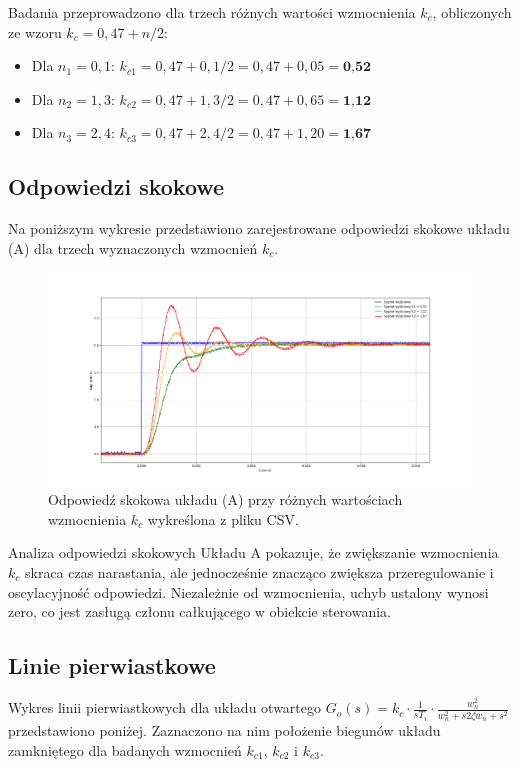 \documentclass[12pt,a4paper]{article}
\begin{document}
	Badania przeprowadzono dla trzech różnych wartości wzmocnienia \(k_c\), obliczonych ze wzoru \(k_c = 0,47 + n/2\):
	\begin{itemize}
		\item Dla \(n_1 = 0,1\): $k_{c1} = 0,47 + 0,1 / 2 = 0,47 + 0,05 = \textbf{0,52}$
		\item Dla \(n_2 = 1,3\): $k_{c2} = 0,47 + 1,3 / 2 = 0,47 + 0,65 = \textbf{1,12}$
		\item Dla \(n_3 = 2,4\): $k_{c3} = 0,47 + 2,4 / 2 = 0,47 + 1,20 = \textbf{1,67}$
	\end{itemize}
	
	\subsection{Odpowiedzi skokowe}
	Na poniższym wykresie przedstawiono zarejestrowane odpowiedzi skokowe układu (A) dla trzech wyznaczonych wzmocnień \(k_c\).
	
	\begin{figure}[H]
		\centering
		\includegraphics[width=1\linewidth]{zdjecia/OdpSkokA.png}
		\caption{Odpowiedź skokowa układu (A) przy różnych wartościach wzmocnienia \(k_c\) wykreślona z pliku CSV.}
		\label{fig:OdpSkokA}
	\end{figure}
	
	Analiza odpowiedzi skokowych Układu A pokazuje, że zwiększanie wzmocnienia $k_c$ skraca czas narastania, ale jednocześnie znacząco zwiększa przeregulowanie i oscylacyjność odpowiedzi. Niezależnie od wzmocnienia, uchyb ustalony wynosi zero, co jest zasługą członu całkującego w obiekcie sterowania.
	
	\subsection{Linie pierwiastkowe}
	Wykres linii pierwiastkowych dla układu otwartego \(G_o(s) = k_c \cdot \frac{1}{sT_i} \cdot \frac{w_n^2}{w_n^2 + s 2 \zeta w_n + s^2}\) przedstawiono poniżej. Zaznaczono na nim położenie biegunów układu zamkniętego dla badanych wzmocnień \(k_{c1}\), \(k_{c2}\) i \(k_{c3}\).
	
\end{document}
